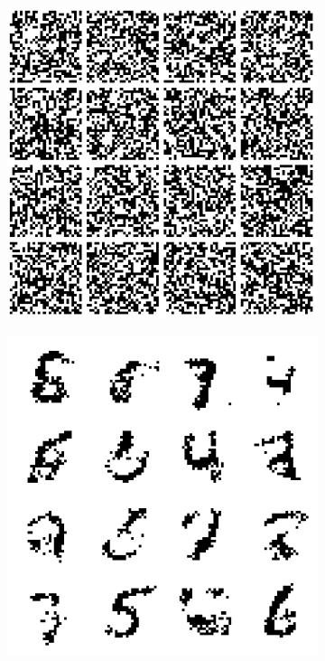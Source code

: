 \documentclass{article}
\begin{document}
\begin{figure}[t]
\begin{subfigure}{0.32\textwidth}
\end{subfigure}\\
\begin{subfigure}{0.32\textwidth}
\centering
\includegraphics[scale=0.25]{img/vae_sample_0}
\end{subfigure}
\begin{subfigure}{0.32\textwidth}
\centering
\includegraphics[scale=0.25]{img/vae_sample_20}
\end{subfigure}
\begin{subfigure}{0.32\textwidth}
\centering

\end{subfigure}
\end{figure}
\end{document}
